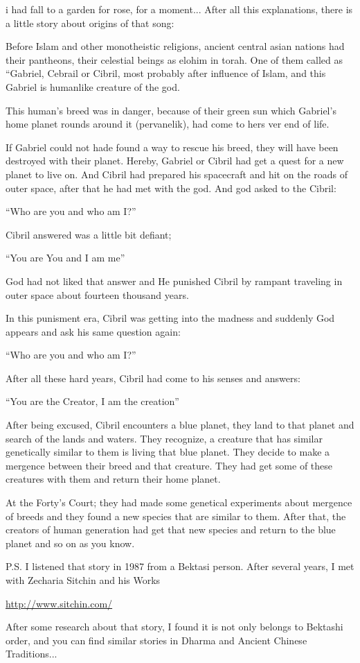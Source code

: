 \begin{footnotesize}
\begin{sffamily}
i had fall to a garden for rose, for a moment... After all this explanations, there is a little story about origins of that song:

Before Islam and other monotheistic religions, ancient central asian nations had their pantheons, their celestial beings as elohim in torah. One of them called as ``Gabriel, Cebrail or Cibril, most probably after influence of Islam, and this Gabriel is humanlike creature of the god.

This human's breed was in danger, because of their green sun which Gabriel's home planet rounds around it (pervanelik), had come to hers ver end of life.

If Gabriel could not hade found a way to rescue his breed, they will have been destroyed with their planet. Hereby, Gabriel or Cibril had get a quest for a new planet to live on. And Cibril had prepared his spacecraft and hit on the roads of outer space, after that he had met with the god. And god asked to the Cibril:

``Who are you and who am I?''

Cibril answered was a little bit defiant;

``You are You and I am me''

God had not liked that answer and He punished Cibril by rampant traveling in outer space about fourteen thousand years.

In this punisment era, Cibril was getting into the madness and suddenly God appears and ask his same question again:

``Who are you and who am I?''

After all these hard years, Cibril had come to his senses and answers:

``You are the Creator, I am the creation''

After being excused, Cibril encounters a blue planet, they land to that planet and search of the lands and waters. They recognize, a creature that has similar genetically similar to them is living that blue planet. They decide to make a mergence between their breed and that creature. They had get some of these creatures with them and return their home planet.

At the Forty's Court; they had made some genetical experiments about mergence of breeds and they found a new species that are similar to them. After that, the creators of human generation had get that new species and return to the blue planet and so on as you know.

P.S. I listened that story in 1987 from a Bektasi person. After several years, I met with Zecharia Sitchin and his Works

\url{http://www.sitchin.com/}


After some research about that story, I found it is not only belongs to Bektashi order, and you can find similar stories in Dharma and Ancient Chinese Traditions... 

\hfill

\end{sffamily}
\end{footnotesize}


